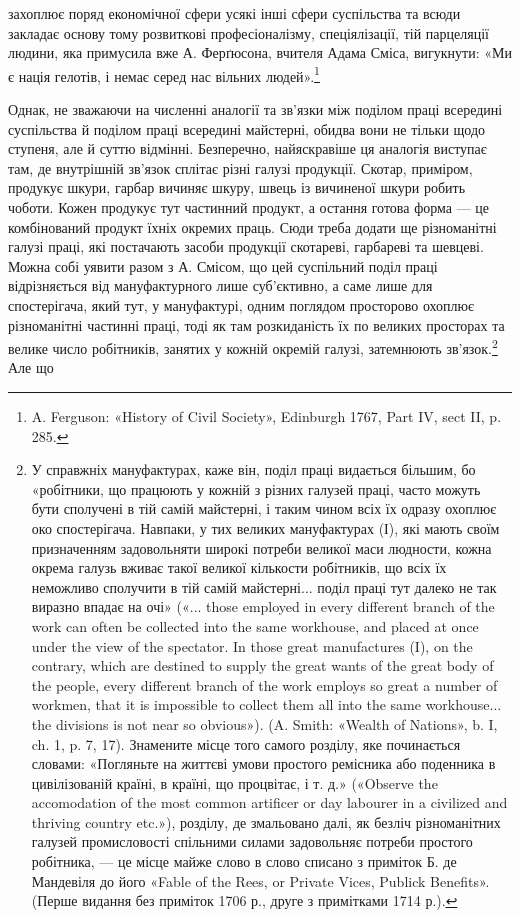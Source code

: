 захоплює поряд економічної сфери усякі інші сфери суспільства
та всюди закладає основу тому розвиткові професіоналізму,
спеціялізації, тій парцеляції людини, яка примусила вже А. Ферґюсона,
вчителя Адама Сміса, вигукнути: «Ми є нація гелотів,
і немає серед нас вільних людей».\footnote{
A. Ferguson: «History of Civil Society», Edinburgh 1767, Part IV,
sect II, p. 285.
}

Однак, не зважаючи на численні аналогії та зв’язки між поділом
праці всередині суспільства й поділом праці всередині майстерні,
обидва вони не тільки щодо ступеня, але й суттю відмінні.
Безперечно, найяскравіше ця аналогія виступає там, де внутрішній
зв’язок сплітає різні галузі продукції. Скотар, приміром,
продукує шкури, гарбар вичиняє шкуру, швець із вичиненої
шкури робить чоботи. Кожен продукує тут частинний продукт,
а остання готова форма — це комбінований продукт їхніх окремих
праць. Сюди треба додати ще різноманітні галузі праці, які
постачають засоби продукції скотареві, гарбареві та шевцеві.
Можна собі уявити разом з А. Смісом, що цей суспільний поділ
праці відрізняється від мануфактурного лише суб’єктивно, а саме
лише для спостерігача, який тут, у мануфактурі, одним поглядом
просторово охоплює різноманітні частинні праці, тоді як там розкиданість
їх по великих просторах та велике число робітників,
занятих у кожній окремій галузі, затемнюють зв’язок.\footnote{
У справжніх мануфактурах, каже він, поділ праці видається
більшим, бо «робітники, що працюють у кожній з різних галузей праці,
часто можуть бути сполучені в тій самій майстерні, і таким чином всіх
їх одразу охоплює око спостерігача. Навпаки, у тих великих мануфактурах
(І), які мають своїм призначенням задовольняти широкі потреби
великої маси людности, кожна окрема галузь вживає такої великої кількости
робітників, що всіх їх неможливо сполучити в тій самій майстерні...
поділ праці тут далеко не так виразно впадає на очі» («... those employed
in every different branch of the work can often be collected into the
same workhouse, and placed at once under the view of the spectator. In
those great manufactures (I), on the contrary, which are destined to supply
the great wants of the great body of the people, every different branch of
the work employs so great a number of workmen, that it is impossible
to collect them all into the same workhouse... the divisions is not near
so obvious»). (A. Smith: «Wealth of Nations», b. I, ch. 1, p. 7, 17).
Знамените місце того самого розділу, яке починається словами:
«Погляньте на життєві умови простого ремісника або поденника в
цивілізованій країні, в країні, що процвітає, і т. д.» («Observe the accomodation
of the most common artificer or day labourer in a civilized and
thriving country etc.»), розділу, де змальовано далі, як безліч різноманітних
галузей промисловості спільними силами задовольняє потреби
простого робітника, — це місце майже слово в слово списано з приміток
Б. де Мандевіля до його «Fable of the Rees, or Private Vices, Publick Benefits».
(Перше видання без приміток 1706 р., друге з примітками 1714 р.).
} Але що
